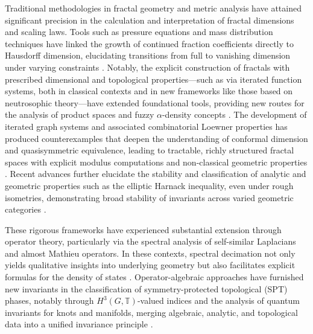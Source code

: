 \documentclass[sigconf]{acmart}
\begin{document}
Traditional methodologies in fractal geometry and metric analysis have attained significant precision in the calculation and interpretation of fractal dimensions and scaling laws. Tools such as pressure equations and mass distribution techniques have linked the growth of continued fraction coefficients directly to Hausdorff dimension, elucidating transitions from full to vanishing dimension under varying constraints \cite{ref24,ref38}. Notably, the explicit construction of fractals with prescribed dimensional and topological properties—such as via iterated function systems, both in classical contexts and in new frameworks like those based on neutrosophic theory—have extended foundational tools, providing new routes for the analysis of product spaces and fuzzy $\alpha$-density concepts \cite{ref10,ref8}. The development of iterated graph systems and associated combinatorial Loewner properties has produced counterexamples that deepen the understanding of conformal dimension and quasisymmetric equivalence, leading to tractable, richly structured fractal spaces with explicit modulus computations and non-classical geometric properties \cite{ref11}. Recent advances further elucidate the stability and classification of analytic and geometric properties such as the elliptic Harnack inequality, even under rough isometries, demonstrating broad stability of invariants across varied geometric categories \cite{ref40}.

These rigorous frameworks have experienced substantial extension through operator theory, particularly via the spectral analysis of self-similar Laplacians and almost Mathieu operators. In these contexts, spectral decimation not only yields qualitative insights into underlying geometry but also facilitates explicit formulas for the density of states \cite{ref54,ref25}. Operator-algebraic approaches have furnished new invariants in the classification of symmetry-protected topological (SPT) phases, notably through $H^3(G,\mathbb{T})$-valued indices and the analysis of quantum invariants for knots and manifolds, merging algebraic, analytic, and topological data into a unified invariance principle \cite{ref19,ref22,ref26,ref56}.
\end{document}
